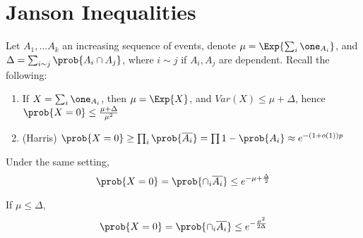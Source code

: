 \documentclass[a4paper, 11pt, oneside]{book}
\begin{document}
\section{Janson Inequalities}
	Let $A_1,\ldots A_k$ an increasing sequence of events, denote $\mu = \Exp{\sum_i \one_{A_i}}$, and $\Delta = \sum_{i\sim j} \prob{A_i\cap A_j}$, where $i\sim j$ if $A_i,A_j$ are dependent.
	Recall the following:
	\begin{enumerate}
		\item If $X = \sum_i \one_{A_i}$, then $\mu = \Exp{X}$, and $Var(X)\le \mu + \Delta$, hence $\prob{X = 0} \le \frac{\mu +\Delta}{\mu^2}$
		\item (Harris) $\prob{X = 0} \ge \prod_i \prob{\overline{A_i}} = \prod{1-\prob{A_i}} \approx e^{-(1+o(1)) p}$
	\end{enumerate}
\begin{thm}
	\label{thm: janson one}
	Under the same setting, \[\prob{X = 0} = \prob{\cap_{i} \overline{A_i}}\le e^{-\mu + \frac{\Delta}{2}}\]
\end{thm}
\begin{thm}
	\label{thm: janson two}
	If $\mu \le \Delta$,
	 \[\prob{X = 0} = \prob{\cap_{i} \overline{A_i}}\le e^{-\frac{\mu^2}{2\Delta}}\]
\end{thm}
\end{document}
